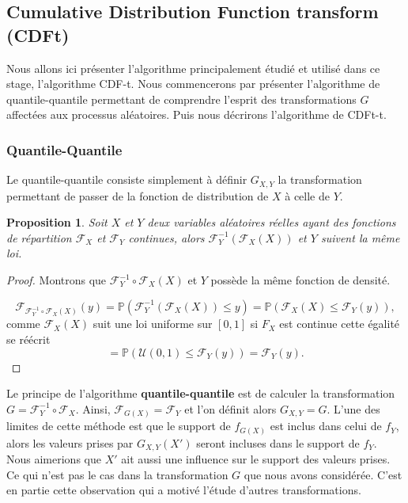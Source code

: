 \documentclass[a4paper,11pt]{article}
\newtheorem{proposition}{Proposition}
\begin{document}
\subsection{Cumulative Distribution Function transform (CDFt)}
Nous allons ici présenter l'algorithme principalement étudié et utilisé dans ce stage, l'algorithme CDF-t. Nous commencerons par présenter l'algorithme de quantile-quantile permettant de comprendre l'esprit des transformations $G$ affectées aux processus aléatoires. Puis nous décrirons l'algorithme de CDFt-t. 
 
\subsubsection{Quantile-Quantile}
\label{Q-Q}
Le quantile-quantile consiste simplement à définir $G_{X,Y}$ la transformation permettant de passer de la fonction de distribution de $X$ à celle de $Y$. 
\begin{proposition}
	Soit $X$ et $Y$ deux variables aléatoires réelles ayant des fonctions de répartition $\mathcal{F}_{X}$ et $\mathcal{F}_{Y}$ continues, alors 
	$\mathcal{F}^{-1}_Y (\mathcal{F}_X(X))$ et $Y$ suivent la même loi. 
\end{proposition}

\begin{proof}
	Montrons que $\mathcal{F}^{-1}_Y \circ \mathcal{F}_X(X)$ et $Y$ possède la même fonction de densité. 
	
	\[\mathcal{F}_{\mathcal{F}^{-1}_Y \circ \mathcal{F}_X(X)}(y)
		= \mathbb{P}(\mathcal{F}^{-1}_Y (\mathcal{F}_X(X))\leq y )
		= \mathbb{P}(\mathcal{F}_{X}(X) \leq \mathcal{F}_Y(y)),\]
	comme $\mathcal{F}_{X}(X)$ suit une loi uniforme sur $[0,1]$ si $F_X$ est continue cette égalité se réécrit
	\[= \mathbb{P}(\mathcal{U}(0,1) \leq \mathcal{F}_Y(y))=\mathcal{F}_Y(y).\]
	
	
\end{proof}
Le principe de l'algorithme \textbf{quantile-quantile} est de calculer la transformation $G=\mathcal{F}^{-1}_{Y} \circ \mathcal{F}_{X}$. Ainsi, $\mathcal{F}_{G(X)}=\mathcal{F}_{Y}$ et l'on définit alors $G_{X,Y}=G$. L'une des limites de cette méthode est que le support de $f_{G(X)}$ est inclus dans celui de $f_{Y}$, alors les valeurs prises par $G
_{X,Y}(X')$ seront incluses dans le support de $f_Y$. Nous aimerions que $X'$ ait aussi une influence sur le support des valeurs prises. Ce qui n'est pas le cas dans la transformation $G$ que nous avons considérée. C'est en partie cette observation qui a motivé l'étude d'autres transformations. 
\end{document}
